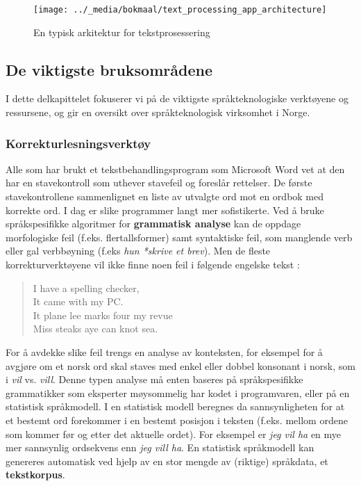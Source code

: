 \begin{multicols}{2}
\begin{figure*}[htb]
  \center
  \texttt{[image: ../\_media/bokmaal/text\_processing\_app\_architecture]}
  \caption{En typisk arkitektur for tekstprosessering}
  \label{fig:textprocessingarch_no}
\end{figure*}

\subsection{De viktigste bruksområdene}

I dette delkapittelet fokuserer vi på de viktigste språkteknologiske verktøyene og ressursene, og gir en oversikt over språkteknologisk virksomhet i Norge. 

\subsubsection{Korrekturlesningsverktøy}

Alle som har brukt et tekstbehandlingsprogram som Microsoft Word vet at den har en stavekontroll som uthever stavefeil og foreslår rettelser. De første stavekontrollene  sammenlignet en liste av utvalgte ord mot en ordbok med korrekte ord. I dag er slike programmer langt mer sofistikerte. Ved å bruke språkspesifikke algoritmer for \textbf{grammatisk analyse} kan de oppdage morfologiske feil (f.eks. flertallsformer) samt syntaktiske feil, som manglende verb eller gal verbbøyning (f.eks \textit{hun *skrive et brev}). Men de fleste korrekturverktøyene vil ikke finne noen feil i følgende engelske tekst \cite{zar1}:
 
\begin{quote}
  I have a spelling checker,\\
  It came with my PC.\\
  It plane lee marks four my revue\\
  Miss steaks aye can knot sea.
\end{quote}

For å avdekke slike feil trengs en analyse av konteksten, for eksempel for å avgjøre om et norsk ord skal staves med enkel eller dobbel konsonant i norsk, som i \textit{vil} vs. \textit{vill}.
Denne typen analyse må enten baseres på språkspesifikke grammatikker som eksperter møysommelig har kodet i programvaren, eller på en statistisk språkmodell. 
I en statistisk modell beregnes da sannsynligheten for at et bestemt ord forekommer i en bestemt posisjon i teksten (f.eks. mellom ordene som kommer før og etter det aktuelle ordet). For eksempel er \textit{jeg vil ha} en mye mer sannsynlig ordsekvens enn \textit{jeg vill ha}. En statistisk språkmodell kan genereres automatisk ved hjelp av en stor mengde av (riktige) språkdata, et \textbf{tekstkorpus}. 


\end{multicols}
